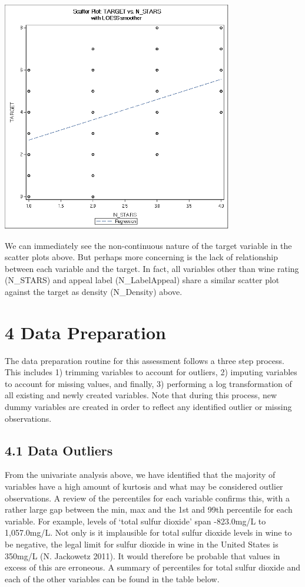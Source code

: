 \documentclass[]{article}
\begin{document}
\includegraphics[height=3.95833in]{images/scatter_stars.png}

\newpage

We can immediately see the non-continuous nature of the target variable
in the scatter plots above. But perhaps more concerning is the lack of
relationship between each variable and the target. In fact, all
variables other than wine rating (N\_STARS) and appeal label
(N\_LabelAppeal) share a similar scatter plot against the target as
density (N\_Density) above.

\section{4 Data Preparation}\label{data-preparation}

The data preparation routine for this assessment follows a three step
process. This includes 1) trimming variables to account for outliers, 2)
imputing variables to account for missing values, and finally, 3)
performing a log transformation of all existing and newly created
variables. Note that during this process, new dummy variables are
created in order to reflect any identified outlier or missing
observations.

\subsection{4.1 Data Outliers}\label{data-outliers}

From the univariate analysis above, we have identified that the majority
of variables have a high amount of kurtosis and what may be considered
outlier observations. A review of the percentiles for each variable
confirms this, with a rather large gap between the min, max and the 1st
and 99th percentile for each variable. For example, levels of `total
sulfur dioxide' span -823.0mg/L to 1,057.0mg/L. Not only is it
implausible for total sulfur dioxide levels in wine to be negative, the
legal limit for sulfur dioxide in wine in the United States is 350mg/L
(N. Jackowetz 2011). It would therefore be probable that values in
excess of this are erroneous. A summary of percentiles for total sulfur
dioxide and each of the other variables can be found in the table below.
\end{document}
